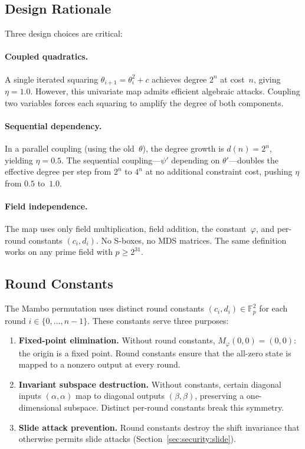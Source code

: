 \documentclass[11pt,a4paper]{article}
\theoremstyle{definition}
\newcommand{\Fp}{\mathbb{F}_p}
\begin{document}
\subsection{Design Rationale}\label{sec:map:rationale}

Three design choices are critical:

\paragraph{Coupled quadratics.}
A single iterated squaring $\theta_{i+1} = \theta_i^2 + c$ achieves degree
$2^n$ at cost~$n$, giving $\eta = 1.0$. However, this univariate map admits
efficient algebraic attacks. Coupling two variables forces each squaring to
amplify the degree of both components.

\paragraph{Sequential dependency.}
In a parallel coupling (using the old~$\theta$), the degree growth is
$d(n) = 2^n$, yielding $\eta = 0.5$. The sequential coupling---$\psi'$
depending on $\theta'$---doubles the effective degree per step from $2^n$ to
$4^n$ at no additional constraint cost, pushing $\eta$ from $0.5$ to~$1.0$.

\paragraph{Field independence.}
The map uses only field multiplication, field addition, the
constant~$\varphi$, and per-round constants $(c_i, d_i)$. No S-boxes, no
MDS matrices. The same definition works on any prime field with
$p \ge 2^{31}$.


\subsection{Round Constants}\label{sec:map:constants}

The Mambo permutation uses distinct round constants $(c_i, d_i) \in \Fp^2$
for each round $i \in \{0, \ldots, n-1\}$. These constants serve three
purposes:
\begin{enumerate}[nosep]
  \item \textbf{Fixed-point elimination.} Without round constants, $M_\varphi(0,0) = (0,0)$: the origin is a fixed point. Round constants ensure that the all-zero state is mapped to a nonzero output at every round.
  \item \textbf{Invariant subspace destruction.} Without constants, certain diagonal inputs $(\alpha,\alpha)$ map to diagonal outputs $(\beta,\beta)$, preserving a one-dimensional subspace. Distinct per-round constants break this symmetry.
  \item \textbf{Slide attack prevention.} Round constants destroy the shift invariance that otherwise permits slide attacks (Section~\ref{sec:security:slide}).
\end{enumerate}
\end{document}
